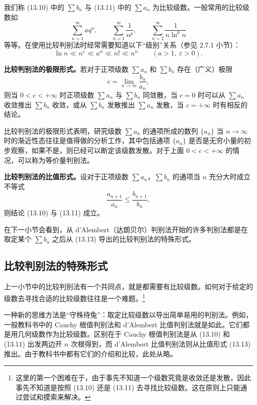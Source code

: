 我们称 (13.10) 中的 $\sum b_n$ 与 (13.11) 中的 $\sum a_n$ 为比较级数。一般常用的比较级数如
\[
\sum_{n=1}^{\infty}aq^n,\qquad \sum_{n=1}^{\infty}\frac1{n^p},\qquad \sum_{n=2}^{\infty}\frac1{n\ln^p n}
\]
等等。在使用比较判别法时经常需要知道以下“级别”关系（参见 2.7.1 小节）：
\[
\ln n\ll n^\varepsilon\ll a^n\ll n!\ll n^n\qquad(a>1,\ \varepsilon>0).
\]

\textbf{比较判别法的极限形式。}若对于正项级数 $\sum a_n$ 和 $\sum b_n$ 存在（广义）极限
\begin{equation}
c=\lim_{n\to\infty}\frac{b_n}{a_n},
\tag{13.12}
\end{equation}
则当 $0<c<+\infty$ 时正项级数 $\sum a_n$ 与 $\sum b_n$ 同敛散，当 $c=0$ 时可以从 $\sum a_n$ 收敛推出 $\sum b_n$ 收敛，或从 $\sum b_n$ 发散推出 $\sum a_n$ 发散，当 $c=+\infty$ 时有相反的结论。

比较判别法的极限形式表明，研究级数 $\sum a_n$ 的通项所成的数列 $\{a_n\}$ 当 $n\to\infty$ 时的渐近性态往往是值得做的分析工作，其中包括通项 $\{a_n\}$ 是否是无穷小量的初步观察，如果不是，则已经可以断定该级数发散。对于上面 $0<c<+\infty$ 的情况，可以称为等价量判别法。

\textbf{比较判别法的比值形式。}设对于正项级数 $\sum a_n$，$\sum b_n$ 的通项当 $n$ 充分大时成立不等式
\begin{equation}
\frac{a_{n+1}}{a_n}\leq\frac{b_{n+1}}{b_n},
\tag{13.13}
\end{equation}
则结论 (13.10) 与 (13.11) 成立。

在下一小节会看到，从 d'Alembert（达朗贝尔）判别法开始的许多判别法都是在取定某个 $\sum b_n$ 之后从 (13.13) 导出的比较判别法的特殊形式。

\subsection{比较判别法的特殊形式}

上一小节中的比较判别法有一个共同点，就是都需要有比较级数。如何对于给定的级数去寻找合适的比较级数往往是一个难题。\footnote{这里的第一个困难在于，由于事先不知道一个级数究竟是收敛还是发散，因此事先不知道是按照 (13.10) 还是 (13.11) 去寻找比较级数。这在原则上只能通过尝试和摸索来解决。}

一种新的思维方法是“守株待兔”：取定比较级数以导出简单易用的判别法。例如，一般教科书中的 Cauchy 根值判别法和 d'Alembert 比值判别法就是如此。它们都是用几何级数作为比较级数。区别在于 Cauchy 根值判别法是从 (13.10) 和 (13.11) 出发两边开 $n$ 次根得到，而 d'Alembert 比值判别法则从比值形式 (13.13) 推出。由于教科书中都有它们的介绍和比较，此处从略。

